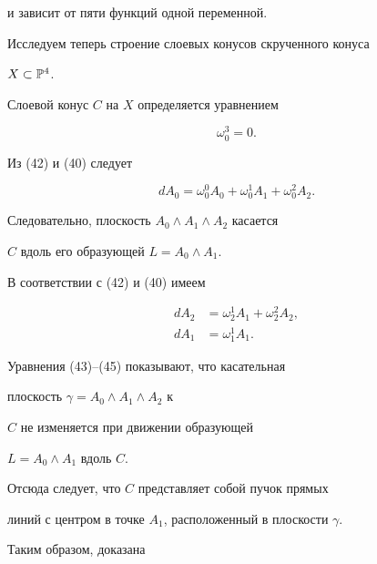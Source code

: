 и зависит от пяти функций одной переменной.





Исследуем теперь строение слоевых конусов скрученного конуса


$X \subset {\Bbb P}^4$.


Слоевой конус $C$ на $X$ определяется уравнением


\begin{equation}\label{eq:50}


\omega_0^3 = 0.


\end{equation}


Из (42) и (40) следует


\begin{equation}\label{eq:51}


d A_0 =  \omega_0^0 A_0 +  \omega_0^1 A_1 + \omega_0^2 A_2.


\end{equation}


Следовательно, плоскость $A_0 \wedge A_1 \wedge A_2$ касается


$C$ вдоль его образующей $L = A_0 \wedge A_1$.


В соответствии с (42) и (40) имеем 


\begin{align}\label{eq:52}


d A_2 &=  \omega_2^1 A_1 +  \omega_2^2 A_2,\\


%


\label{eq:53}


d A_1 &=  \omega_1^1 A_1.


\end{align}


Уравнения  (43)--(45) показывают, что касательная


плоскость $\gamma = A_0 \wedge A_1 \wedge A_2$ к 


$C$ не изменяется при движении образующей


$L = A_0 \wedge A_1$ вдоль  $C$.


Отсюда следует, что $C$ представляет собой пучок прямых


линий с центром в точке  $A_1$, расположенный в плоскости $\gamma$.





Таким образом, доказана 





